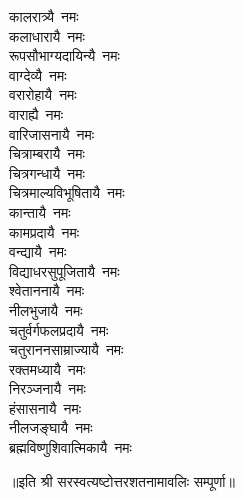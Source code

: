 \begin{multicols}{2}
\begin{flushleft}
कालरात्र्यै~नमः\\
कलाधारायै~नमः\\
रूपसौभाग्यदायिन्यै~नमः\\
वाग्देव्यै~नमः\\
वरारोहायै~नमः\hfill{}\\
वाराह्यै~नमः\\
वारिजासनायै~नमः\\
चित्राम्बरायै~नमः\\
चित्रगन्धायै~नमः\\
चित्रमाल्यविभूषितायै~नमः\\
कान्तायै~नमः\\
कामप्रदायै~नमः\\
वन्द्यायै~नमः\\
विद्याधरसुपूजितायै~नमः\\
श्वेताननायै~नमः\hfill{}\\
नीलभुजायै~नमः\\
चतुर्वर्गफलप्रदायै~नमः\\
चतुराननसाम्राज्यायै~नमः\\
रक्तमध्यायै~नमः\\
निरञ्जनायै~नमः\\
हंसासनायै~नमः\\
नीलजङ्घायै~नमः\\
ब्रह्मविष्णुशिवात्मिकायै~नमः\\
\end{flushleft}
\end{multicols}
॥इति श्री सरस्वत्यष्टोत्तरशतनामावलिः सम्पूर्णा॥
